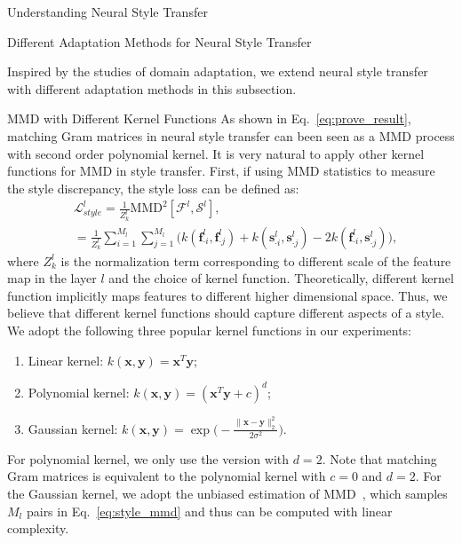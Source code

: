 \documentclass{article}
\newcommand{\col}[2]{#1_{\cdot #2}}
\begin{document}
\begin{section}{Understanding Neural Style Transfer}
\begin{subsection}{Different Adaptation Methods for Neural Style Transfer}

Inspired by the studies of domain adaptation, we extend neural style transfer with different adaptation methods in this subsection.

\begin{paragraph}{MMD with Different Kernel Functions}
As shown in Eq.~\ref{eq:prove_result}, matching Gram matrices in neural style transfer can been seen as a MMD process with second order polynomial kernel. It is very natural to apply other kernel functions for MMD in style transfer. First, if using MMD statistics to measure the style discrepancy, the style loss can be defined as:
\begin{equation}\label{eq:style_mmd}
\begin{aligned}
&\mathcal{L}_{style}^l = \frac{1}{Z^l_k}\text{MMD}^2[\mathcal{F}^{l}, \mathcal{S}^{l}],\\
	&= \frac{1}{Z^l_k}\sum_{i=1}^{M_l}\sum_{j=1}^{M_l}\Big( 
		k(\col{\mathbf{f}^l}{i}, \col{\mathbf{f}^l}{j}) +
		  k(\col{\mathbf{s}^l}{i}, \col{\mathbf{s}^l}{j}) - 2k(\col{\mathbf{f}^l}{i}, \col{\mathbf{s}^l}{j})
	\Big),
\end{aligned}
\end{equation}
where $Z^l_k$ is the normalization term corresponding to different scale of the feature map in the layer $l$ and the choice of  kernel function. Theoretically, different kernel function implicitly maps features to different higher dimensional space. Thus, we believe that different kernel functions should capture different aspects of a style. We adopt the following three popular kernel functions in our experiments:
\begin{enumerate}[{(1)}]
	\item Linear kernel: $k(\mathbf{x}, \mathbf{y}) = \mathbf{x}^T\mathbf{y}$;
	\item Polynomial kernel: $k(\mathbf{x}, \mathbf{y}) = (\mathbf{x}^T\mathbf{y} + c)^d$;
	\item Gaussian kernel: $k(\mathbf{x}, \mathbf{y}) = \exp\big( -\frac{\|\mathbf{x} - \mathbf{y}\|_2^2}{2\sigma^2}  \big)$.
\end{enumerate}
For polynomial kernel, we only use the version with $d = 2$. Note that matching Gram matrices is equivalent to the polynomial kernel with $c = 0$ and $d = 2$. For the Gaussian kernel, we adopt the unbiased estimation of MMD~\cite{gretton2012optimal}, which samples $M_l$ pairs in Eq.~\ref{eq:style_mmd} and thus can be computed with linear complexity. %

\end{paragraph}
\end{subsection}
\end{section}
\end{document}
